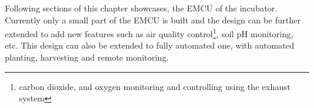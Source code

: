 \documentclass[../../main]{subfiles}
\begin{document}

Following sections of this chapter showcases, the EMCU of the incubator. Currently only a
small part of the EMCU is built and the design can be further extended to add new features
such as air quality control\footnote{carbon dioxide, and oxygen monitoring and controlling
using the exhaust system}, soil pH monitoring, etc. This design can also be extended to
fully automated one, with automated planting, harvesting and remote monitoring.
\end{document}
